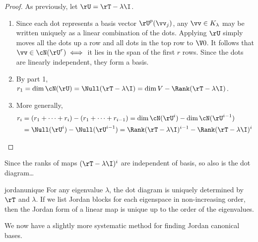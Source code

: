 \begin{proof}
As previously, let $\rU=\rT-\lambda\I$.
\begin{enumerate}
  \item Since each dot represents a basis vector $\rU^p(\vv_j)$, any $\vv\in K_\lambda$ may be written uniquely as a linear combination of the dots. Applying $\rU$ simply moves all the dots up a row and all dots in the top row to $\V0$. It follows that $\vv\in \cN(\rU^r)\iff$ it lies in the span of the first $r$ rows. Since the dots are linearly independent, they form a basis.
  \item By part 1, $r_1=\dim \cN(\rU)=\Null(\rT-\lambda \I)=\dim V-\Rank(\rT-\lambda \I)$.
  \item More generally,
  \begin{align*}
  r_i&=(r_1+\cdots+r_i)-(r_1+\cdots +r_{i-1})=\dim\cN(\rU^i)-\dim \cN(\rU^{i-1})\\
  &=\Null(\rU^i)-\Null(\rU^{i-1})=\Rank(\rT-\lambda \I)^{i-1}-\Rank(\rT-\lambda \I)^{i}\tag*{\qedhere}
  \end{align*}
\end{enumerate}
\end{proof}

\goodbreak

Since the ranks of maps $(\rT-\lambda\I)^i$ are independent of basis, so also is the dot diagram\ldots

\begin{cor}{}{jordanunique}
For any eigenvalue $\lambda$, the dot diagram is uniquely determined by $\rT$ and $\lambda$. If we list Jordan blocks for each eigenspace in non-increasing order, then the Jordan form of a linear map is unique up to the order of the eigenvalues.
\end{cor}

We now have a slightly more systematic method for finding Jordan canonical bases.

